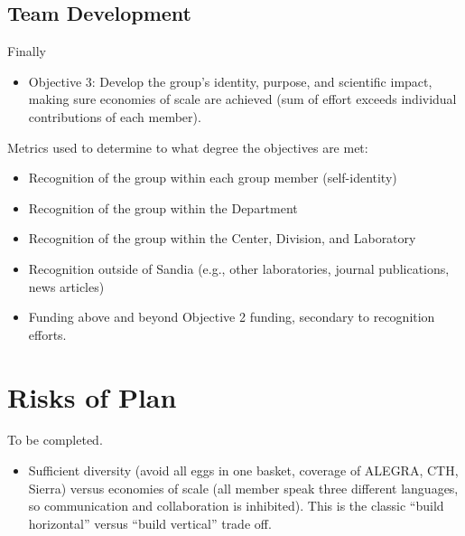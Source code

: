 \documentclass[12pt,reqno]{amsart}
\begin{document}
\subsection{Team Development}
Finally
\begin{itemize}
\item Objective 3: Develop the group's identity, purpose, and 
scientific impact, 
making sure economies of scale are achieved (sum of effort exceeds 
individual contributions of each member).
\end{itemize}
Metrics used to determine to what degree the objectives are met:
\begin{itemize}
\item Recognition of the group within each group member (self-identity)
\item Recognition of the group within the Department
\item Recognition of the group within the Center, Division, and Laboratory
\item Recognition outside of Sandia (e.g., other laboratories, 
 journal publications, news articles)
\item Funding above and beyond Objective 2 funding, secondary to 
recognition efforts. 
\end{itemize}









\section{Risks of Plan}
To be completed.
\begin{itemize}
\item Sufficient diversity (avoid all eggs in one basket, coverage
of ALEGRA, CTH, Sierra) versus economies of scale (all member speak
three different languages, so communication and collaboration is 
inhibited).  This is the classic ``build horizontal'' versus 
``build vertical'' trade off.
\end{itemize}
\end{document}
